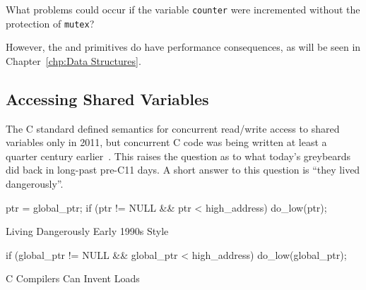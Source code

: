 \QuickQuiz{}
	What problems could occur if the variable {\tt counter} were
	incremented without the protection of {\tt mutex}?
 \QuickQuizEnd

However, the  and  primitives
do have performance consequences, as will be seen in
Chapter~\ref{chp:Data Structures}.

\subsection{Accessing Shared Variables}
\label{sec:toolsoftrade:Accessing Shared Variables}

The C standard defined semantics for concurrent read/write access to
shared variables only in 2011, but concurrent C code was being
written at least a quarter century earlier~\cite{Beck85,Inman85}.
This raises the question as to what today's greybeards did back
in long-past pre-C11 days.
A short answer to this question is ``they lived dangerously''.

\begin{listing}[tbp]
\begin{linelabel}
\begin{VerbatimL}[commandchars=\\\{\}]
ptr = global_ptr;
if (ptr != NULL && ptr < high_address)
	do_low(ptr);
\end{VerbatimL}
\end{linelabel}
\caption{Living Dangerously Early 1990s Style}
\label{lst:toolsoftrade:Living Dangerously Early 1990s Style}
\end{listing}

\begin{listing}[tbp]
\begin{linelabel}
\begin{VerbatimL}[commandchars=\\\{\}]
if (global_ptr != NULL &&
    global_ptr < high_address)
	do_low(global_ptr);
\end{VerbatimL}
\end{linelabel}
\caption{C Compilers Can Invent Loads}
\label{lst:toolsoftrade:C Compilers Can Invent Loads}
\end{listing}

